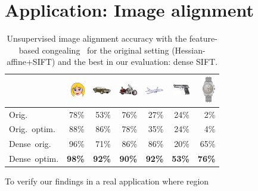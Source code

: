 \documentclass[review]{elsarticle}
\begin{document}
\section{Application: Image alignment}
%
\begin{table}[h]
  \caption{Unsupervised image alignment accuracy with
    the feature-based congealing~\cite{LanKam:2011} for the original
    setting (Hessian-affine+SIFT) and the best in our evaluation: dense SIFT.
  \label{tab:alignment}}
  \begin{center}
    \begin{tabular}{lrrrrrr}
      \toprule
      & \includegraphics[width=0.6cm]{resources/face.png}
      & \includegraphics[width=0.8cm]{resources/car_side.png}
      & \includegraphics[width=0.8cm]{resources/motorbike.png}
      & \includegraphics[width=0.8cm]{resources/airplane.png}
      & \includegraphics[width=0.7cm]{resources/revolver.png}
      & \includegraphics[trim=0 160 0 100, clip=true, width=0.6cm]{resources/watch.png} \\
      \midrule
      Orig.~\cite{LanKam:2011} 
      & 78\% & 53\% & 76\% & 27\% & 24\% &  2\% \\
      Orig.~optim. 
      & 88\% & 86\% & 78\% & 35\% & 24\% &  4\%\\
      Dense~orig. 
      & 96\% & 71\% & 86\% & 86\% & 20\% & 65\%\\
      Dense~optim. 
      & {\bf 98\%} & {\bf 92\%} & {\bf 90\%} & {\bf 92\%} & {\bf 53\%} & {\bf 76\%}\\
      \bottomrule
    \end{tabular}
  \end{center}
\end{table}
To verify our findings in a real application where region
\end{document}
